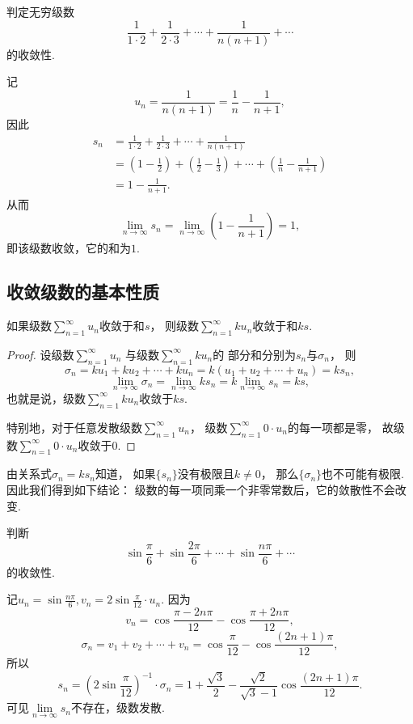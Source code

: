 \begin{example}
判定无穷级数\[
\frac{1}{1\cdot2}+\frac{1}{2\cdot3}+\dotsb+\frac{1}{n(n+1)}+\dotsb
\]的收敛性.
\begin{solution}
记\[
	u_n = \frac{1}{n(n+1)} = \frac{1}{n}-\frac{1}{n+1},
\]
因此\begin{align*}
	s_n &= \frac{1}{1\cdot2}+\frac{1}{2\cdot3}+\dotsb+\frac{1}{n(n+1)} \\
	&= \left(1-\frac{1}{2}\right)+\left(\frac{1}{2}-\frac{1}{3}\right)
	+\dotsb+\left(\frac{1}{n}-\frac{1}{n+1}\right) \\
	&= 1-\frac{1}{n+1}.
\end{align*}
从而\[
	\lim\limits_{n\to\infty} s_n = \lim\limits_{n\to\infty} \left(1-\frac{1}{n+1}\right) = 1,
\]
即该级数收敛，它的和为\(1\).
\end{solution}
\end{example}

\subsection{收敛级数的基本性质}
\begin{property}\label{theorem:无穷级数.收敛级数性质1}
如果级数\(\sum\limits_{n=1}^\infty u_n\)收敛于和\(s\)，
则级数\(\sum\limits_{n=1}^\infty k u_n\)收敛于和\(ks\).
\begin{proof}
设级数\(\sum\limits_{n=1}^\infty u_n\)
与级数\(\sum\limits_{n=1}^\infty k u_n\)的
部分和分别为\(s_n\)与\(\sigma_n\)，
则\[
	\sigma_n
	= k u_1 + k u_2 + \dotsb + k u_n
	= k(u_1 + u_2 + \dotsb + u_n) = k s_n,
\]\[
	\lim\limits_{n\to\infty} \sigma_n
	= \lim\limits_{n\to\infty} k s_n
	= k \lim\limits_{n\to\infty} s_n = ks,
\]
也就是说，级数\(\sum\limits_{n=1}^\infty k u_n\)收敛于\(ks\).

特别地，对于任意发散级数\(\sum\limits_{n=1}^\infty u_n\)，
级数\(\sum\limits_{n=1}^\infty 0 \cdot u_n\)的每一项都是零，
故级数\(\sum\limits_{n=1}^\infty 0 \cdot u_n\)收敛于\(0\).
\end{proof}
\end{property}

由关系式\(\sigma_n = k s_n\)知道，
如果\(\{s_n\}\)没有极限且\(k\neq0\)，
那么\(\{\sigma_n\}\)也不可能有极限.
因此我们得到如下结论：
{\color{red}级数的每一项同乘一个非零常数后，它的敛散性不会改变.}

\begin{example}
判断\[
\sin\frac{\pi}{6}+\sin\frac{2\pi}{6}+\dotsb+\sin\frac{n\pi}{6}+\dotsb
\]的收敛性.
\begin{solution}
记\(u_n = \sin\frac{n\pi}{6},
v_n = 2\sin\frac{\pi}{12} \cdot u_n\).
因为\[
	v_n = \cos\frac{\pi-2n\pi}{12} - \cos\frac{\pi+2n\pi}{12},
\]\[
	\sigma_n
	= v_1 + v_2 + \dotsb + v_n
	= \cos\frac{\pi}{12} - \cos\frac{(2n+1)\pi}{12},
\]
所以\[
	s_n
	= \left(2\sin\frac{\pi}{12}\right)^{-1} \cdot \sigma_n
	= 1+\frac{\sqrt{3}}{2} - \frac{\sqrt{2}}{\sqrt{3}-1} \cos\frac{(2n+1)\pi}{12}.
\]
可见\(\lim\limits_{n\to\infty} s_n\)不存在，级数发散.
\end{solution}
\end{example}


